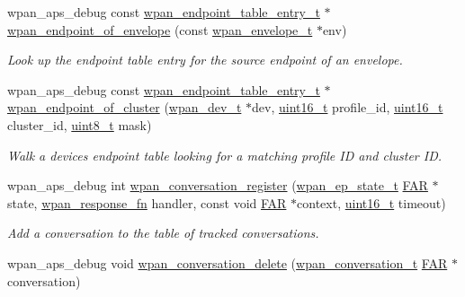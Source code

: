 \begin{DoxyCompactItemize}
wpan\+\_\+aps\+\_\+debug const \hyperlink{structwpan__endpoint__table__entry__t}{wpan\+\_\+endpoint\+\_\+table\+\_\+entry\+\_\+t} $\ast$ \hyperlink{group__wpan__aps_gab448ec18a47178272336da5eacfa2290}{wpan\+\_\+endpoint\+\_\+of\+\_\+envelope} (const \hyperlink{structwpan__envelope__t}{wpan\+\_\+envelope\+\_\+t} $\ast$env)
\begin{DoxyCompactList}\small\item\em Look up the endpoint table entry for the source endpoint of an envelope. \end{DoxyCompactList}\item 
wpan\+\_\+aps\+\_\+debug const \hyperlink{structwpan__endpoint__table__entry__t}{wpan\+\_\+endpoint\+\_\+table\+\_\+entry\+\_\+t} $\ast$ \hyperlink{group__wpan__aps_ga2cc975231963e0eb75c449c11b1d95de}{wpan\+\_\+endpoint\+\_\+of\+\_\+cluster} (\hyperlink{structwpan__dev__t}{wpan\+\_\+dev\+\_\+t} $\ast$dev, \hyperlink{group__hal__dos_ga5a8b2dc9e45a9ee81a94ef304fb62505}{uint16\+\_\+t} profile\+\_\+id, \hyperlink{group__hal__dos_ga5a8b2dc9e45a9ee81a94ef304fb62505}{uint16\+\_\+t} cluster\+\_\+id, \hyperlink{group__hal__dos_gae1affc9ca37cfb624959c866a73f83c2}{uint8\+\_\+t} mask)
\begin{DoxyCompactList}\small\item\em Walk a device\textquotesingle{}s endpoint table looking for a matching profile ID and cluster ID. \end{DoxyCompactList}\item 
wpan\+\_\+aps\+\_\+debug int \hyperlink{group__wpan__aps_gae5f88ed40bd334d963e261947b77b980}{wpan\+\_\+conversation\+\_\+register} (\hyperlink{structwpan__ep__state__t}{wpan\+\_\+ep\+\_\+state\+\_\+t} \hyperlink{group__hal_gaef060b3456fdcc093a7210a762d5f2ed}{F\+AR} $\ast$state, \hyperlink{group__wpan__aps_gabf0a6b85c9ff3ff9104c8b58c1436d72}{wpan\+\_\+response\+\_\+fn} handler, const void \hyperlink{group__hal_gaef060b3456fdcc093a7210a762d5f2ed}{F\+AR} $\ast$context, \hyperlink{group__hal__dos_ga5a8b2dc9e45a9ee81a94ef304fb62505}{uint16\+\_\+t} timeout)
\begin{DoxyCompactList}\small\item\em Add a conversation to the table of tracked conversations. \end{DoxyCompactList}\item 
wpan\+\_\+aps\+\_\+debug void \hyperlink{group__wpan__aps_gad36c04a3f2741f52710ab7768d1fcda8}{wpan\+\_\+conversation\+\_\+delete} (\hyperlink{structwpan__conversation__t}{wpan\+\_\+conversation\+\_\+t} \hyperlink{group__hal_gaef060b3456fdcc093a7210a762d5f2ed}{F\+AR} $\ast$conversation)

\end{DoxyCompactItemize}
